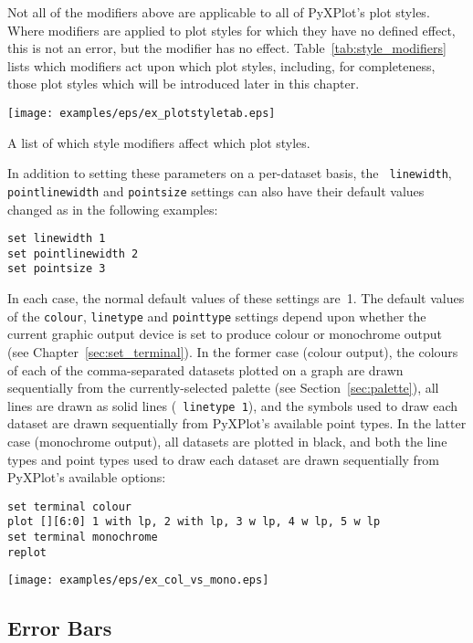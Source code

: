 \noindent Not all of the modifiers above are applicable to all of PyXPlot's
plot styles. Where modifiers are applied to plot styles for which they have no
defined effect, this is not an error, but the modifier has no effect.
Table~\ref{tab:style_modifiers} lists which modifiers act upon which plot
styles, including, for completeness, those plot styles which will be introduced
later in this chapter.

\begin{table}
\centerline{\texttt{[image: examples/eps/ex\_plotstyletab.eps]}}
\caption{A list of which style modifiers affect which plot styles.}
\label{tab:style_modifiers}
\end{table}

In addition to setting these parameters on a per-dataset basis, the {\tt
linewidth}, {\tt pointlinewidth} and {\tt pointsize} settings can also have
their default values changed as in the following examples:
\begin{verbatim}
set linewidth 1
set pointlinewidth 2
set pointsize 3
\end{verbatim}
In each case, the normal default values of these settings are~1. The default
values of the {\tt colour}, {\tt linetype} and {\tt pointtype} settings depend
upon whether the current graphic output device is set to produce colour or
monochrome output (see Chapter~\ref{sec:set_terminal}). In the former case
(colour output), the colours of each of the comma-separated datasets plotted on
a graph are drawn sequentially from the currently-selected palette (see
Section~\ref{sec:palette}), all lines are drawn as solid lines ({\tt
line\-type~1}), and the symbols used to draw each dataset are drawn
sequentially from PyXPlot's available point types. In the latter case
(monochrome output), all datasets are plotted in black, and both the line types
and point types used to draw each dataset are drawn sequentially from PyXPlot's
available options:
\begin{verbatim}
set terminal colour
plot [][6:0] 1 with lp, 2 with lp, 3 w lp, 4 w lp, 5 w lp
set terminal monochrome
replot
\end{verbatim}
\centerline{\texttt{[image: examples/eps/ex\_col\_vs\_mono.eps]}}

\subsection{Error Bars}
\label{sec:errorbars}

